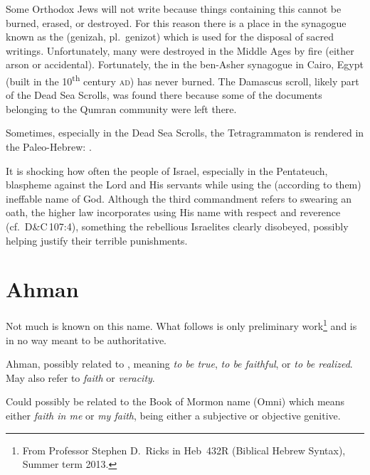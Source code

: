 Some Orthodox Jews will not write  because things containing this cannot be burned, erased, or destroyed. For this reason there is a place in the synagogue known as the  (genizah, pl.\ genizot) which is used for the disposal of sacred writings. Unfortunately, many  were destroyed in the Middle Ages by fire (either arson or accidental). Fortunately, the  in the ben-Asher synagogue in Cairo, Egypt (built in the 10\textsuperscript{th} century \textsc{ad}) has never burned. The Damascus scroll, likely part of the Dead Sea Scrolls, was found there because some of the documents belonging to the Qumran community were left there.

Sometimes, especially in the Dead Sea Scrolls, the Tetragrammaton is rendered in the Paleo-Hebrew: .

It is shocking how often the people of Israel, especially in the Pentateuch, blaspheme against the Lord and His servants while using the (according to them) ineffable name of God. Although the third commandment refers to swearing an oath, the higher law incorporates using His name with respect and reverence (cf.~D\&C\,107:4), something the rebellious Israelites clearly disobeyed, possibly helping justify their terrible punishments.

\section{Ahman}
Not much is known on this name. What follows is only preliminary work\footnote{From Professor Stephen D.\ Ricks in Heb~432R (Biblical Hebrew Syntax), Summer term 2013.} and is in no way meant to be authoritative.

Ahman, possibly related to , meaning \emph{to be true}, \emph{to be faithful}, or \emph{to be realized}. May also refer to \emph{faith} or \emph{veracity}.

Could possibly be related to the Book of Mormon name  (Omni) which means either \emph{faith in me} or \emph{my faith},  being either a subjective or objective genitive.
